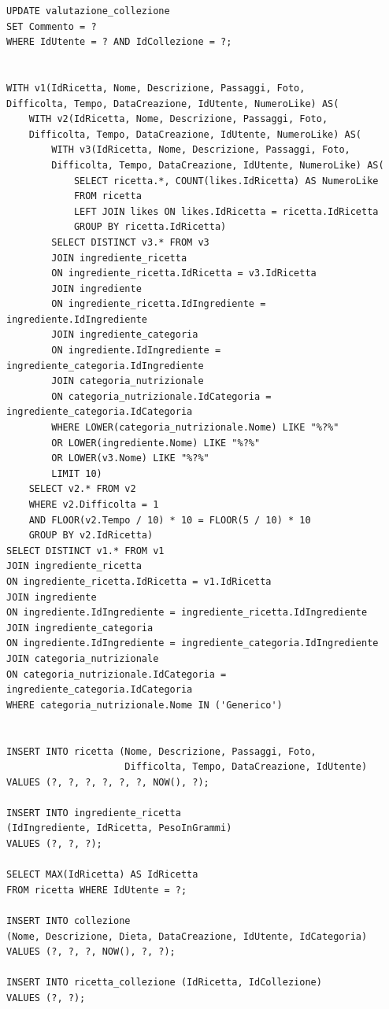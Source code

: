 ﻿\documentclass[a4paper,12pt]{report}
\begin{document}
\begin{verbatim}
UPDATE valutazione_collezione
SET Commento = ?
WHERE IdUtente = ? AND IdCollezione = ?;


WITH v1(IdRicetta, Nome, Descrizione, Passaggi, Foto,
Difficolta, Tempo, DataCreazione, IdUtente, NumeroLike) AS(
    WITH v2(IdRicetta, Nome, Descrizione, Passaggi, Foto, 
    Difficolta, Tempo, DataCreazione, IdUtente, NumeroLike) AS(
        WITH v3(IdRicetta, Nome, Descrizione, Passaggi, Foto, 
        Difficolta, Tempo, DataCreazione, IdUtente, NumeroLike) AS(
            SELECT ricetta.*, COUNT(likes.IdRicetta) AS NumeroLike
            FROM ricetta
            LEFT JOIN likes ON likes.IdRicetta = ricetta.IdRicetta
            GROUP BY ricetta.IdRicetta)
        SELECT DISTINCT v3.* FROM v3
        JOIN ingrediente_ricetta
        ON ingrediente_ricetta.IdRicetta = v3.IdRicetta
        JOIN ingrediente
        ON ingrediente_ricetta.IdIngrediente = ingrediente.IdIngrediente
        JOIN ingrediente_categoria
        ON ingrediente.IdIngrediente = ingrediente_categoria.IdIngrediente
        JOIN categoria_nutrizionale 
        ON categoria_nutrizionale.IdCategoria = ingrediente_categoria.IdCategoria
        WHERE LOWER(categoria_nutrizionale.Nome) LIKE "%?%"
        OR LOWER(ingrediente.Nome) LIKE "%?%"
        OR LOWER(v3.Nome) LIKE "%?%"
        LIMIT 10)
    SELECT v2.* FROM v2
    WHERE v2.Difficolta = 1
    AND FLOOR(v2.Tempo / 10) * 10 = FLOOR(5 / 10) * 10 
    GROUP BY v2.IdRicetta)
SELECT DISTINCT v1.* FROM v1
JOIN ingrediente_ricetta
ON ingrediente_ricetta.IdRicetta = v1.IdRicetta
JOIN ingrediente
ON ingrediente.IdIngrediente = ingrediente_ricetta.IdIngrediente
JOIN ingrediente_categoria
ON ingrediente.IdIngrediente = ingrediente_categoria.IdIngrediente
JOIN categoria_nutrizionale
ON categoria_nutrizionale.IdCategoria = ingrediente_categoria.IdCategoria
WHERE categoria_nutrizionale.Nome IN ('Generico')


INSERT INTO ricetta (Nome, Descrizione, Passaggi, Foto,
                     Difficolta, Tempo, DataCreazione, IdUtente)
VALUES (?, ?, ?, ?, ?, ?, NOW(), ?);

INSERT INTO ingrediente_ricetta
(IdIngrediente, IdRicetta, PesoInGrammi)
VALUES (?, ?, ?);

SELECT MAX(IdRicetta) AS IdRicetta
FROM ricetta WHERE IdUtente = ?;

INSERT INTO collezione
(Nome, Descrizione, Dieta, DataCreazione, IdUtente, IdCategoria)
VALUES (?, ?, ?, NOW(), ?, ?);

INSERT INTO ricetta_collezione (IdRicetta, IdCollezione)
VALUES (?, ?);


\end{verbatim}
\end{document}
